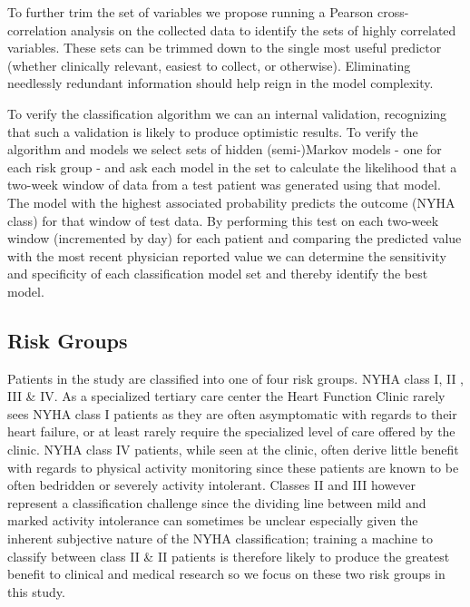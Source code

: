 \documentclass[]{article}
\begin{document}
To further trim the set of variables we propose running a Pearson cross-correlation analysis on the collected data to identify the sets of highly correlated variables. These sets can be trimmed down to the single most useful predictor (whether clinically relevant, easiest to collect, or otherwise). Eliminating needlessly redundant information should help reign in the model complexity.

To verify the classification algorithm we can an internal validation, recognizing that such a validation is likely to produce optimistic results. To verify the algorithm and models we select sets of hidden (semi-)Markov models - one for each risk group - and ask each model in the set to calculate the likelihood that a two-week window of data from a test patient was generated using that model. The model with the highest associated probability predicts the outcome (NYHA class) for that window of test data. By performing this test on each two-week window (incremented by day) for each patient and comparing the predicted value with the most recent physician reported value we can determine the sensitivity and specificity of each classification model set and thereby identify the best model.

\subsection{Risk Groups} %

Patients in the study are classified into one of four risk groups. NYHA class I, II , III \& IV. As a specialized tertiary care center the Heart Function Clinic rarely sees NYHA class I patients as they are often asymptomatic with regards to their heart failure, or at least rarely require the specialized level of care offered by the clinic. NYHA class IV patients, while seen at the clinic, often derive little benefit with regards to physical activity monitoring since these patients are known to be often bedridden or severely activity intolerant. Classes II and III however represent a classification challenge since the dividing line between mild and marked activity intolerance can sometimes be unclear especially given the inherent subjective nature of the NYHA classification; training a machine to classify between class II \& II patients is therefore likely to produce the greatest benefit to clinical and medical research so we focus on these two risk groups in this study.
\end{document}
